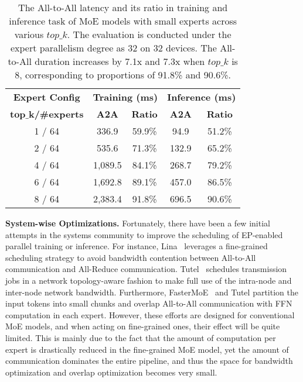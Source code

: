 \begin{table}[!t]
    \centering
    \begin{tabular}{c|cc|cc}
    \toprule[0.8pt]
    \textbf{Expert Config} & \multicolumn{2}{c|}{\textbf{Training (ms)}} & \multicolumn{2}{c}{\textbf{Inference (ms)}} \\
    \textbf{$\bm{top\_k}$/\#experts } & \textbf{A2A}        & \textbf{Ratio}        & \textbf{A2A}        & \textbf{Ratio}        \\ \midrule[0.8pt]
    1 / 64   &     336.9          &  59.9\%            &     94.9			&	51.2\%    \\
    2 / 64   &     535.6          &  71.3\%            &     132.9			&	65.2\%        \\
    4 / 64   &     1,089.5          &  84.1\%            &     268.7			&	79.2\%    \\
    6 / 64   &     1,692.8          &  89.1\%            &     457.0			&	86.5\%         \\
    8 / 64   &     2,383.4          &  91.8\%            &     696.5			&	90.6\%    \\ 
    \bottomrule[0.8pt]
    \end{tabular}
    \caption{The All-to-All latency and its ratio in training and inference task of MoE models with small experts across various $top\_k$. The evaluation is conducted under the expert parallelism degree as 32 on 32 devices. The All-to-All duration increases by 7.1x and 7.3x when $top\_k$ is 8, corresponding to proportions of 91.8\% and 90.6\%.
}
    \label{table.comm.ratio}
\end{table}

\noindent\textbf{System-wise Optimizations. }
Fortunately, there have been a few initial attempts in the systems community to improve the scheduling of EP-enabled parallel training or inference. 
For instance, Lina~\cite{li2023accelerating} leverages a fine-grained scheduling strategy to avoid bandwidth contention between All-to-All communication and All-Reduce communication. 
Tutel~\cite{hwang2023tutel} schedules transmission jobs in a network topology-aware fashion %
to make full use of the intra-node and inter-node network bandwidth. 
Furthermore, FasterMoE~\cite{he2022fastermoe} and Tutel partition the input tokens into small chunks and overlap All-to-All communication with FFN computation in each expert. 
However, these efforts are designed for conventional MoE models, and when acting on fine-grained ones, their effect will be quite limited. This is mainly due to the fact that the amount of computation per expert is drastically reduced in the fine-grained MoE model, yet the amount of communication dominates the entire pipeline, and thus the space for bandwidth optimization and overlap optimization becomes very small.

